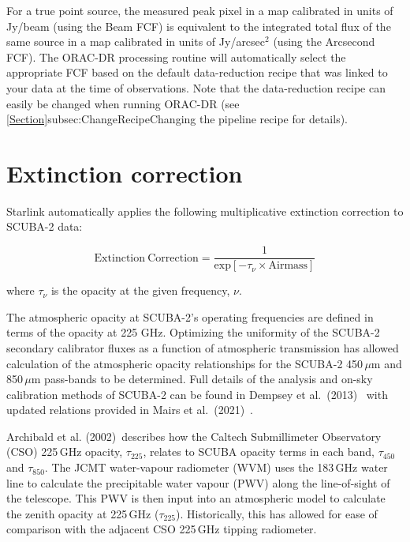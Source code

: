 For a true point source, the measured peak pixel in a map calibrated in units of Jy/beam
(using the Beam FCF) is equivalent to the integrated total flux of the same source in a map
calibrated in units of Jy/arcsec$^{2}$ (using the Arcsecond FCF). The ORAC-DR processing
routine will automatically select the appropriate FCF based on the default data-reduction recipe
that was linked to your data at the time of observations. Note that the data-reduction recipe can
easily be changed when running ORAC-DR (see
\cref{Section}{subsec:ChangeRecipe}{Changing the pipeline recipe} for details).

\section{Extinction correction}

Starlink automatically applies the following multiplicative extinction correction to SCUBA-2 data:

\begin{equation}
\label{eq:extcor}
\mathrm{Extinction\:Correction} = \frac{1}{\mathrm{exp}[-\tau_{\nu}\times\mathrm{Airmass}]}
\end{equation}

where $\tau_{\nu}$ is the opacity at the given frequency, $\nu$.

The atmospheric opacity at SCUBA-2’s operating frequencies are defined in
terms of the opacity at 225 GHz. Optimizing the uniformity of the SCUBA-2 secondary
calibrator fluxes as a function of atmospheric transmission has allowed calculation
of the atmospheric opacity relationships for the SCUBA-2 450\,$\mu$m and
850\,$\mu$m pass-bands to be determined. Full details of the analysis
and on-sky calibration methods of SCUBA-2 can be found in Dempsey et
al.\ (2013)~\cite{dempsey12}\cite{dempsey-spie} with
updated relations provided in Mairs et al.\ (2021)~\cite{mairs21}.

Archibald et al. (2002)\,\cite{archibald} describes how the Caltech
Submillimeter Observatory (CSO) 225\,GHz opacity, $\tau_{225}$,
relates to SCUBA opacity terms in each band, $\tau_{450}$ and
$\tau_{850}$. The JCMT water-vapour radiometer (WVM) uses the 183\,GHz
water line to calculate the precipitable water vapour (PWV) along the
line-of-sight of the telescope. This PWV is then input into an
atmospheric model to calculate the zenith opacity at 225\,GHz
($\tau_{225}$). Historically, this has allowed for ease of
comparison with the adjacent CSO 225\,GHz tipping radiometer.

